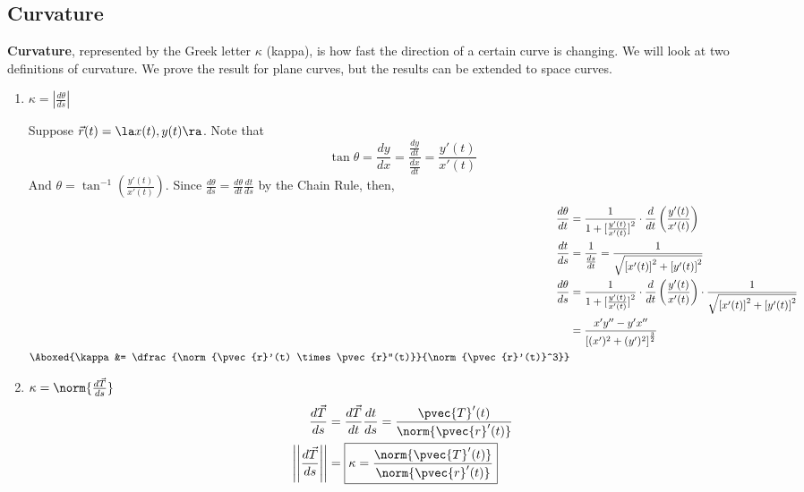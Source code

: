\documentclass[12pt]{article}
\begin{document}
\subsection{Curvature}
\textbf{Curvature}, represented by the Greek letter $\kappa$ (kappa), is how fast the direction of a certain curve is changing. We will look at two definitions of curvature. We prove the result for plane curves, but the results can be extended to space curves.
\begin{enumerate}
\item $\kappa = \left|\frac{d\theta}{ds}\right|$ \\
\begin{figure}[h!]
\centering
{}
\end{figure}
Suppose $\vec{r}(t) = \la x(t), y(t) \ra$. Note that \[ \tan{\theta} = \frac{dy}{dx} = \dfrac{\frac{dy}{dt}}{\frac{dx}{dt}} = \frac{y'(t)}{x'(t)} \]
And $\theta = \tan^{-1}\left(\frac{y'(t)}{x'(t)}\right)$. Since $\frac{d\theta}{ds} = \frac{d\theta}{dt}\frac{dt}{ds}$ by the Chain Rule, then,
\[ 
\begin{aligned}
\frac{d\theta}{dt} &= \dfrac{1}{1 + {[}\frac{y'(t)}{x'(t)}{]}^2} \cdot \frac{d}{dt}\left(\frac{y'(t)}{x'(t)}\right) \\
\frac{dt}{ds} &= \dfrac{1}{\frac{ds}{dt}} = \frac{1}{\sqrt{{[}x'(t){]}^2 + {[}y'(t){]}^2}} \\
\frac{d\theta}{ds} &= \dfrac{1}{1 + {[}\frac{y'(t)}{x'(t)}{]}^2} \cdot \frac{d}{dt}\left(\frac{y'(t)}{x'(t)}\right) \cdot  \frac{1}{\sqrt{{[}x'(t){]}^2 + {[}y'(t){]}^2}} \\
&= \dfrac{x'y''-y'x''}{{[}(x')^2+(y')^2{]}^{\frac{3}{2}}} \\
\Aboxed{\kappa &= \dfrac{\norm{\pvec{r}'(t) \times \pvec{r}''(t)}}{\norm{\pvec{r}'(t)}^3}} \\
\end{aligned}
\]
\item $\kappa = \norm{\frac{d\vec{T}}{ds}}$
\[ 
\begin{aligned}
\frac{d\vec{T}}{ds} &= \frac{d\vec{T}}{dt} \frac{dt}{ds} = \frac{\pvec{T}'(t)}{\norm{\pvec{r}'(t)}} \\
\left|\left|\frac{d\vec{T}}{ds}\right|\right| &= \boxed{\kappa = \frac{\norm{\pvec{T}'(t)}}{\norm{\pvec{r}'(t)}}}
\end{aligned}
\]
\end{enumerate}
\end{document}
